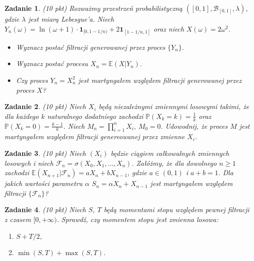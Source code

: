 \documentclass{mwart}
\title{}
\newtheorem{zd}{Zadanie}
\begin{document}

{}
\begin{zd}(10 pkt)\newline
Rozważmy przestrzeń probabilistyczną $\left([0, 1], \mathcal{B}_{[0, 1]}, \lambda \right)$, gdzie $\lambda$ jest miarą Lebesgue'a. Niech $Y_n(\omega) = \ln(\omega+1)\cdot \pmb{1}_{[0, 1 - 1/n)} + 2\pmb{1}_{[1-1/n, 1]}$ oraz niech $X(\omega) = 2\omega^2$.
\begin{itemize}
\item Wyznacz postać filtracji generowanej przez proces $\{Y_n\}$.
\item Wyznacz postać procesu $X_n = \mathbb{E}\left(X|Y_n\right)$.
\item Czy proces $Y_n = X_n^2$ jest martyngałem względem filtracji generowanej przez proces $X$?
\end{itemize}
\end{zd}

\begin{zd}(10 pkt)\newline
Niech $X_i$ będą niezależnymi zmiennymi losowymi takimi, że dla każdego $k$ naturalnego dodatniego zachodzi $\mathbb{P}(X_k=k)=\frac{1}{k}$ oraz $\mathbb{P}(X_k = 0)= \frac{k-1}{k}$. Niech $M_n = \prod_{i=1}^nX_i,\ M_0=0$. Udowodnij, że proces $M$ jest martyngałem względem filtracji genereowanej przez zmienne $X_i$.
\end{zd}

\begin{zd}(10 pkt)\newline
Niech $(X_i)$ będzie ciągiem całkowalnych zmiennych losowych i niech $\mathcal{F}_n = \sigma(X_0, X_1, \dots, X_n)$. Załóżmy, że dla dowolnego $n \geq 1$ zachodzi $\mathbb{E}(X_{n+1}|\mathcal{F}_n) = aX_n + bX_{n-1}$, gdzie $a\in (0, 1)$ i $a+b=1$. Dla jakich wartości parametru $\alpha$ $S_n = \alpha X_n + X_{n-1}$ jest martyngałem względem filtracji $\{\mathcal{F}_n\}$?
\end{zd}

\begin{zd}(10 pkt)\newline
Niech $S$, $T$ będą momentami stopu względem pewnej filtracji z czasem $[0, +\infty)$. Sprawdź, czy momentem stopu jest zmienna losowa:
\begin{enumerate}
\item $S+T/2$,
\item $\min(S, T) + \max(S, T)$.
\end{enumerate}
\end{zd}
\end{document}
